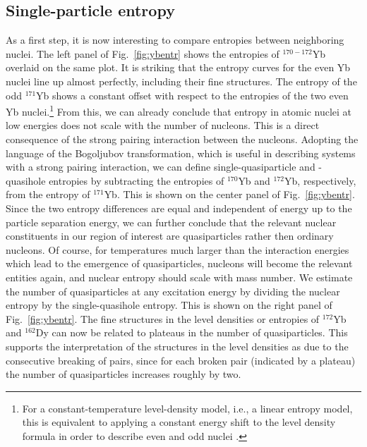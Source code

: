 \documentclass[sort&compress,final,numberedheadings]{aipproc}
\begin{document}
\subsection{Single-particle entropy}
\label{sect:spe}

As a first step, it is now interesting to compare entropies between neighboring
nuclei. The left panel of Fig.\ \ref{fig:ybentr} shows the entropies of 
$^{170-172}$Yb overlaid on the same plot. It is striking that the entropy 
curves for the even Yb nuclei line up almost perfectly, including their fine 
structures. The entropy of the odd $^{171}$Yb shows a constant offset with 
respect to the entropies of the two even Yb nuclei.\footnote{For a 
constant-temperature level-density model, i.e., a linear entropy model, this is
equivalent to applying a constant energy shift to the level density formula in 
order to describe even and odd nuclei \protect\cite{GH00}.} From this, we can 
already conclude that entropy in atomic nuclei at low energies does not scale 
with the number of nucleons. This is a direct consequence of the strong pairing
interaction between the nucleons. Adopting the language of the Bogoljubov 
transformation, which is useful in describing systems with a strong pairing 
interaction, we can define single-quasiparticle and -quasihole entropies by 
subtracting the entropies of $^{170}$Yb and $^{172}$Yb, respectively, from the 
entropy of $^{171}$Yb. This is shown on the center panel of Fig.\ 
\ref{fig:ybentr}. Since the two entropy differences are equal and independent 
of energy up to the particle separation energy, we can further conclude that 
the relevant nuclear constituents in our region of interest are quasiparticles 
rather then ordinary nucleons. Of course, for temperatures much larger than the
interaction energies which lead to the emergence of quasiparticles, nucleons 
will become the relevant entities again, and nuclear entropy should scale with 
mass number. We estimate the number of quasiparticles at any excitation energy 
by dividing the nuclear entropy by the single-quasihole entropy. This is shown 
on the right panel of Fig.\ \ref{fig:ybentr}. The fine structures in the level 
densities or entropies of $^{172}$Yb and $^{162}$Dy can now be related to 
plateaus in the number of quasiparticles. This supports the interpretation of 
the structures in the level densities as due to the consecutive breaking of 
pairs, since for each broken pair (indicated by a plateau) the number of 
quasiparticles increases roughly by two.
\end{document}
